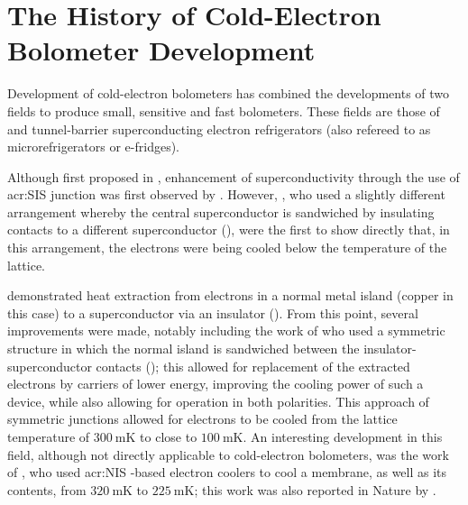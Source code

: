 \section{The History of Cold-Electron Bolometer Development}\label{sec:history}
Development of cold-electron bolometers has combined the developments of two fields to produce small, sensitive and fast bolometers. These fields are those of  and tunnel-barrier superconducting electron refrigerators (also refereed to as microrefrigerators or e-fridges).
\par 
Although  first proposed in \textcite{Parmenter1961}, enhancement of superconductivity through the use of \gls{acr:SIS} junction was first observed by \textcite{Chi1979}. However, \textcite{Manninen1999}, who used a slightly different arrangement whereby the central superconductor is sandwiched by insulating contacts to a different superconductor (), were the first to show directly that, in this arrangement, the electrons were being cooled below the temperature of the lattice.
\par 
\textcite{Nahum1994} demonstrated heat extraction from electrons in a normal metal island (copper in this case) to a superconductor via an insulator (). From this point, several improvements were made, notably including the work of \textcite{Levio1996} who used a symmetric structure in which the normal island is sandwiched between the insulator-superconductor contacts (); this allowed for replacement of the extracted electrons by carriers of lower energy, improving the cooling power of such a device, while also allowing for operation in both polarities. This approach of symmetric junctions allowed for electrons to be cooled from the lattice temperature of $300~\mathrm{mK}$ to close to $100~\mathrm{mK}$. An interesting development in this field, although not directly applicable to cold-electron bolometers, was the work of \textcite{Clark2005}, who used \gls{acr:NIS} -based electron coolers to cool a membrane, as well as its contents, from $320~\mathrm{mK}$ to $225~\mathrm{mK}$; this work was also reported in Nature by \textcite{Pekola2005}.
\par 
